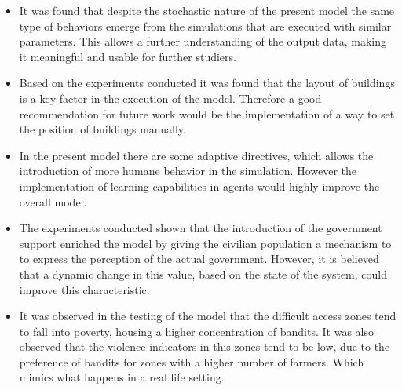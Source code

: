 \documentclass{wscpaperproc}
\begin{document}
\begin{itemize}
    \item It was found that despite the stochastic nature of the present model
    the same type of behaviors emerge from the simulations that are executed
    with similar parameters. This allows a further understanding of the output
    data, making it meaningful and usable for further studiers.

    \item Based on the experiments conducted it was found that the layout of
    buildings is a key factor in the execution of the model. Therefore a good
    recommendation for future work would be the implementation of a way to
    set the position of buildings manually.

    \item In the present model there are some adaptive directives, which allows
    the introduction of more humane behavior in the simulation. However the
    implementation of learning capabilities in agents would highly improve the
    overall model.

    \item The experiments conducted shown that the introduction of the
    government support enriched the model by giving the civilian population a
    mechanism to to express the perception of the actual government. However,
    it is believed that a dynamic change in this value, based on the state of
    the system, could improve this characteristic.

    \item It was observed in the testing of the model that the difficult access
    zones tend to fall into poverty, housing a higher concentration of bandits.
    It was also observed that the violence indicators in this zones tend to be
    low, due to the preference of bandits for zones with a higher number of
    farmers. Which mimics what happens in a real life setting.
\end{itemize}



\end{document}
